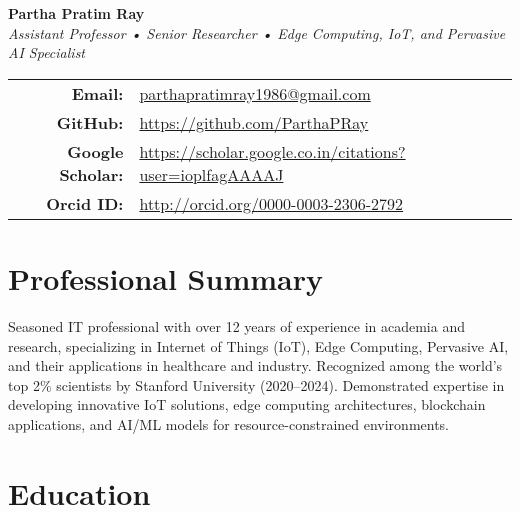\documentclass[10pt,a4paper]{article}
\begin{document}
	
	\begin{center}
		{\LARGE \textbf{Partha Pratim Ray}}\\
		\vspace{1mm}
		\textit{Assistant Professor • Senior Researcher • Edge Computing, IoT, and Pervasive AI Specialist}\\
		\vspace{1mm}
		\begin{tabular}{rl}
			\textbf{Email:} & \href{mailto:parthapratimray1986@gmail.com}{parthapratimray1986@gmail.com} \\
			\textbf{GitHub:} & \href{https://github.com/ParthaPRay}{https://github.com/ParthaPRay} \\
			\textbf{Google Scholar:} & \href{https://scholar.google.co.in/citations?user=ioplfagAAAAJ&hl=en&oi=ao}{https://scholar.google.co.in/citations?user=ioplfagAAAAJ} \\
			\textbf{Orcid ID:} & \href{http://orcid.org/0000-0003-2306-2792}{http://orcid.org/0000-0003-2306-2792} \\
		\end{tabular}
	\end{center}
	
	\section*{Professional Summary}
	
	Seasoned IT professional with over 12 years of experience in academia and research, specializing in Internet of Things (IoT), Edge Computing, Pervasive AI, and their applications in healthcare and industry. Recognized among the world's top 2\% scientists by Stanford University (2020--2024). Demonstrated expertise in developing innovative IoT solutions, edge computing architectures, blockchain applications, and AI/ML models for resource-constrained environments.
	
	\section*{Education}
	
\end{document}
